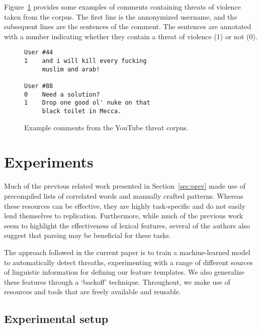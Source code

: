 \documentclass[11pt,letterpaper]{article}
\newcommand{\tov}{threat of violence}
\newcommand{\tovs}{threats of violence}
\begin{document}
Figure~\ref{fig:comments} provides some examples of comments containing \tovs{} taken from the corpus. The first line is the annonymized username, and the subsequent lines are the sentences of the comment. %
The sentences are annotated with a number indicating whether they contain a \tov{} (1) or not (0).

\begin{figure}
\begin{Verbatim}[fontsize=\small]
User #44
1    and i will kill every fucking
     muslim and arab!

User #88
0    Need a solution?
1    Drop one good ol' nuke on that
     black toilet in Mecca.
\end{Verbatim}
\caption{Example comments from the YouTube threat corpus.}
\label{fig:comments}
\end{figure}

\section{Experiments}
\label{sec:exp}
Much of the previous related work presented in Section~\ref{sec:prev} made use of precompiled lists of correlated words and manually crafted patterns. Whereas these resources can be effective, they are highly task-specific and do not easily lend themselves to replication. Furthermore, while much of the previous work seem to highlight the effectiveness of lexical features, several of the authors also suggest that parsing may be beneficial for these tasks.

The approach followed in the current paper is to train a machine-learned model to automatically detect threaths, experimenting with a range of different sources of linguistic information for defining our feature templates. 
We also generalize these features through a `backoff' technique. Throughout, we make use of resources and tools that are freely available and reusable.


\subsection{Experimental setup}
\end{document}
